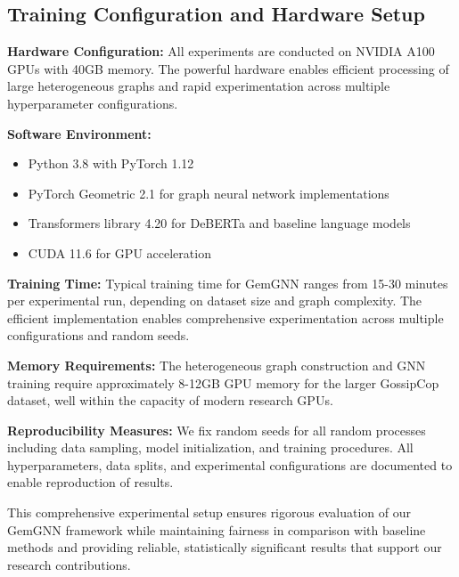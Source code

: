 \subsection{Training Configuration and Hardware Setup}

\textbf{Hardware Configuration:} All experiments are conducted on NVIDIA A100 GPUs with 40GB memory. The powerful hardware enables efficient processing of large heterogeneous graphs and rapid experimentation across multiple hyperparameter configurations.

\textbf{Software Environment:} 
\begin{itemize}
\item Python 3.8 with PyTorch 1.12
\item PyTorch Geometric 2.1 for graph neural network implementations
\item Transformers library 4.20 for DeBERTa and baseline language models
\item CUDA 11.6 for GPU acceleration
\end{itemize}

\textbf{Training Time:} Typical training time for GemGNN ranges from 15-30 minutes per experimental run, depending on dataset size and graph complexity. The efficient implementation enables comprehensive experimentation across multiple configurations and random seeds.

\textbf{Memory Requirements:} The heterogeneous graph construction and GNN training require approximately 8-12GB GPU memory for the larger GossipCop dataset, well within the capacity of modern research GPUs.

\textbf{Reproducibility Measures:} We fix random seeds for all random processes including data sampling, model initialization, and training procedures. All hyperparameters, data splits, and experimental configurations are documented to enable reproduction of results.

This comprehensive experimental setup ensures rigorous evaluation of our GemGNN framework while maintaining fairness in comparison with baseline methods and providing reliable, statistically significant results that support our research contributions.

\EndChapter
